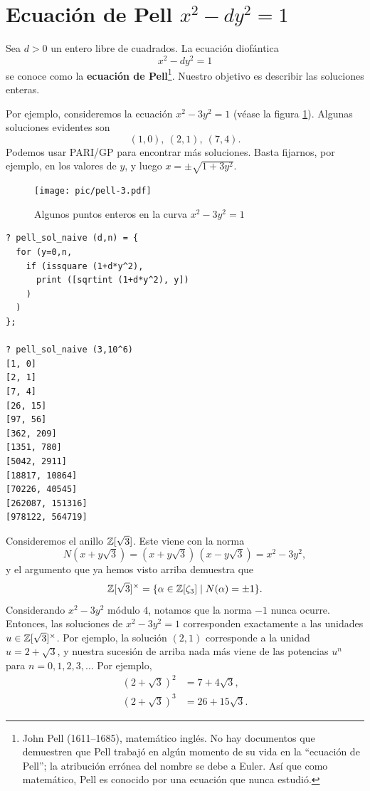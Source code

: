 
\section{Ecuación de Pell \texorpdfstring{$x^2 - dy^2 = 1$}{x² - dy² = 1}}

Sea $d > 0$ un entero libre de cuadrados. La ecuación diofántica
$$x^2 - dy^2 = 1$$
se conoce como la \textbf{ecuación de Pell}\footnote{John Pell (1611--1685),
  matemático inglés. No hay documentos que demuestren que Pell trabajó en algún
  momento de su vida en la ``ecuación de Pell''; la atribución errónea del
  nombre se debe a Euler. Así que como matemático, Pell es conocido por una
  ecuación que nunca estudió.}.
Nuestro objetivo es describir las soluciones enteras.

Por ejemplo, consideremos la ecuación $x^2 - 3y^2 = 1$ (véase la figura
\ref{fig:pell-3}). Algunas soluciones evidentes son
$$(1, 0), ~ (2, 1), ~ (7, 4).$$
Podemos usar PARI/GP para encontrar más soluciones. Basta fijarnos, por ejemplo,
en los valores de $y$, y luego $x = \pm\sqrt{1 + 3y^2}$.

\begin{figure}
  \begin{center}
    \texttt{[image: pic/pell-3.pdf]}
  \end{center}

  \caption{Algunos puntos enteros en la curva $x^2 - 3y^2 = 1$}
  \label{fig:pell-3}
\end{figure}

\begin{shaded}
\begin{verbatim}
? pell_sol_naive (d,n) = {
  for (y=0,n,
    if (issquare (1+d*y^2),
      print ([sqrtint (1+d*y^2), y])
    )
  )
};

? pell_sol_naive (3,10^6)
[1, 0]
[2, 1]
[7, 4]
[26, 15]
[97, 56]
[362, 209]
[1351, 780]
[5042, 2911]
[18817, 10864]
[70226, 40545]
[262087, 151316]
[978122, 564719]
\end{verbatim}
\end{shaded}

Consideremos el anillo $\mathbb{Z} [\sqrt{3}]$. Este viene con la norma
$$N (x + y\sqrt{3}) = (x + y\sqrt{3})\,(x - y\sqrt{3}) = x^2 - 3y^2,$$
y el argumento que ya hemos visto arriba demuestra que
\[ \mathbb{Z} [\sqrt{3}]^\times
       = \{ \alpha \in \mathbb{Z} [\zeta_3] \mid N (\alpha) = \pm 1 \}. \]
Considerando $x^2 - 3y^2$ módulo $4$, notamos que la norma $-1$ nunca
ocurre. Entonces, las soluciones de ${x^2 - 3y^2 = 1}$ corresponden exactamente
a las unidades $u \in \mathbb{Z} [\sqrt{3}]^\times$. Por ejemplo, la solución $(2,1)$
corresponde a la unidad $u = 2 + \sqrt{3}$, y nuestra sucesión de arriba nada
más viene de las potencias $u^n$ para $n = 0,1,2,3,\ldots$ Por ejemplo,
\begin{align*}
  (2 + \sqrt{3})^2 & = 7 + 4\sqrt{3},\\
  (2 + \sqrt{3})^3 & = 26 + 15\sqrt{3}.
\end{align*}

